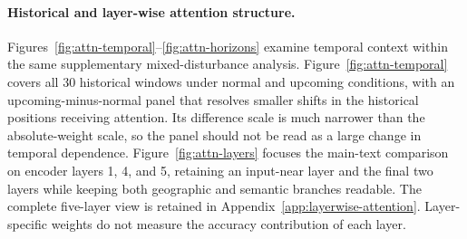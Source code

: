 \paragraph*{Historical and layer-wise attention structure.}
Figures~\ref{fig:attn-temporal}--\ref{fig:attn-horizons} examine temporal context within the same supplementary mixed-disturbance analysis. Figure~\ref{fig:attn-temporal} covers all 30 historical windows under normal and upcoming conditions, with an upcoming-minus-normal panel that resolves smaller shifts in the historical positions receiving attention. Its difference scale is much narrower than the absolute-weight scale, so the panel should not be read as a large change in temporal dependence. Figure~\ref{fig:attn-layers} focuses the main-text comparison on encoder layers 1, 4, and 5, retaining an input-near layer and the final two layers while keeping both geographic and semantic branches readable. The complete five-layer view is retained in Appendix~\ref{app:layerwise-attention}. Layer-specific weights do not measure the accuracy contribution of each layer.

